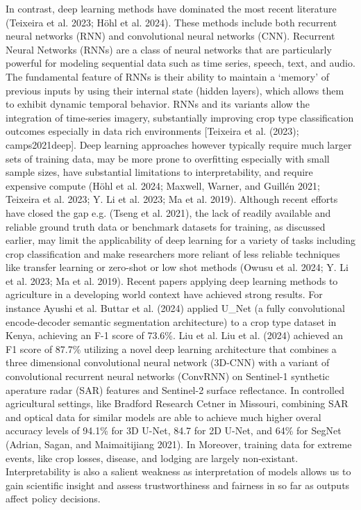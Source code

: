 \documentclass[
  journal,
  twocolumn]{IEEEtran}
\begin{document}
In contrast, deep learning methods have dominated the most recent
literature (Teixeira et al. 2023; Höhl et al. 2024). These methods
include both recurrent neural networks (RNN) and convolutional neural
networks (CNN). Recurrent Neural Networks (RNNs) are a class of neural
networks that are particularly powerful for modeling sequential data
such as time series, speech, text, and audio. The fundamental feature of
RNNs is their ability to maintain a `memory' of previous inputs by using
their internal state (hidden layers), which allows them to exhibit
dynamic temporal behavior. RNNs and its variants allow the integration
of time-series imagery, substantially improving crop type classification
outcomes especially in data rich environments {[}Teixeira et al. (2023);
camps2021deep{]}. Deep learning approaches however typically require
much larger sets of training data, may be more prone to overfitting
especially with small sample sizes, have substantial limitations to
interpretability, and require expensive compute (Höhl et al. 2024;
Maxwell, Warner, and Guillén 2021; Teixeira et al. 2023; Y. Li et al.
2023; Ma et al. 2019). Although recent efforts have closed the gap e.g.
(Tseng et al. 2021), the lack of readily available and reliable ground
truth data or benchmark datasets for training, as discussed earlier, may
limit the applicability of deep learning for a variety of tasks
including crop classification and make researchers more reliant of less
reliable techniques like transfer learning or zero-shot or low shot
methods (Owusu et al. 2024; Y. Li et al. 2023; Ma et al. 2019). Recent
papers applying deep learning methods to agriculture in a developing
world context have achieved strong results. For instance Ayushi et al.
Buttar et al. (2024) applied U\_Net (a fully convolutional
encode-decoder semantic segmentation architecture) to a crop type
dataset in Kenya, achieving an F-1 score of 73.6\%. Liu et al. Liu et
al. (2024) achieved an F1 score of 87.7\% utilizing a novel deep
learning architecture that combines a three dimensional convolutional
neural network (3D-CNN) with a variant of convolutional recurrent neural
networks (ConvRNN) on Sentinel-1 synthetic aperature radar (SAR)
features and Sentinel-2 surface reflectance. In controlled agricultural
settings, like Bradford Research Cetner in Missouri, combining SAR and
optical data for similar models are able to achieve much higher overal
accuracy levels of 94.1\% for 3D U-Net, 84.7 for 2D U-Net, and 64\% for
SegNet (Adrian, Sagan, and Maimaitijiang 2021). In Moreover, training
data for extreme events, like crop losses, disease, and lodging are
largely non-existant. Interpretability is also a salient weakness as
interpretation of models allows us to gain scientific insight and assess
trustworthiness and fairness in so far as outputs affect policy
decisions.
\end{document}
